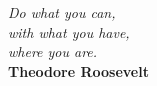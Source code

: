 \begin{epigrafe}
    \vspace*{\fill}
	\begin{flushright}
		\textit{Do what you can,\\ with what you have,\\ where you are.\\}
		\textbf{Theodore Roosevelt}
	\end{flushright}
\end{epigrafe}